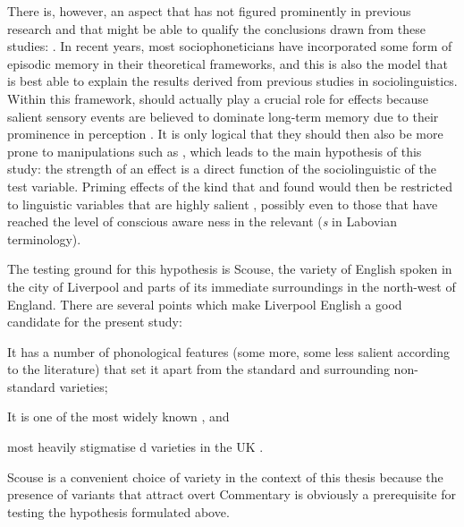 There is, however, an aspect that has not figured prominently in previous research and that might be able to qualify the conclusions drawn from these studies: .
In recent years, most sociophoneticians have incorporated some form of episodic memory  in their theoretical frameworks, and this is also the model that is best able to explain the results derived from previous  studies in sociolinguistics.
Within this framework,  should actually play a crucial role for  effects because salient  sensory events are believed to dominate long-term memory  due to their prominence in perception \parencite[cf.][]{pierrehumbert2006}.
It is only logical that they should then also be more prone to manipulations such as , which leads to the main hypothesis of this study: the strength of an   effect is a direct function of the sociolinguistic  of the test variable.
Priming  effects of the kind that \textcite{niedzielski1999} and \textcite{hayetal2006a} found would then be restricted to linguistic variables that are highly salient , possibly even to those that have reached the level of conscious  aware ness in the relevant  (\emph{s} in Labovian terminology).

The testing ground for this hypothesis is Scouse, the variety of English spoken in the city of Liverpool and parts of its immediate surroundings in the north-west of England.
There are several points which make Liverpool English a good candidate for the present study:
\begin{inparaenum}[(1)]
	\item It has a number of phonological features (some more, some less salient  according to the literature) that set it apart from the standard and surrounding non-standard varieties;
	\item It is one of the most widely known \parencite[cf.][]{trudgill1999}, and
	\item most heavily stigmatise d varieties in the UK \parencite[cf.][]{montgomery2007}.
\end{inparaenum}
Scouse is a convenient choice of variety in the context of this thesis because the presence of variants that attract overt Commentary  is obviously a prerequisite for testing the hypothesis formulated above.

